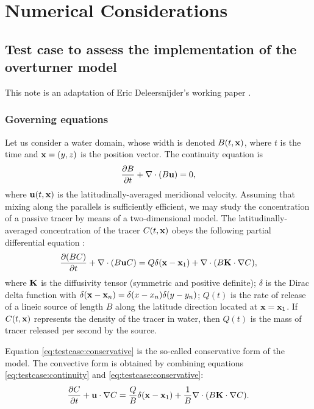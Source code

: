 \chapter{Numerical Considerations}
\section{Test case to assess the implementation of the overturner model}
This note is an adaptation of Eric Deleersnijder's working paper \cite{deleersnijder2011test}.

\subsection{Governing equations}
Let us consider a water domain, whose width is denoted $B(t,\mathbf{x})$, where $t$ is the time and $\mathbf{x} = (y,z)$ is the position vector. The continuity equation is
\begin{equation} \label{eq:testcase:continuity}
	\frac{\partial B}{\partial t} + \nabla \cdot (B\mathbf{u}) = 0,
\end{equation}
where $\mathbf{u}(t,\mathbf{x})$ is the latitudinally-averaged meridional velocity. Assuming that mixing along the parallels is sufficiently efficient, we may study the concentration of a passive tracer by means of a two-dimensional model. The latitudinally-averaged concentration of the tracer $C(t,\mathbf{x})$ obeys the following partial differential equation :
\begin{equation} \label{eq:testcase:conservative}
	\frac{\partial (BC)}{\partial t} + \nabla \cdot (B \mathbf{u} C) = Q\delta(\mathbf{x} - \mathbf{x}_1) + \nabla \cdot (B\mathbf{K} \cdot \nabla C), 
\end{equation}
where $\mathbf{K}$ is the diffusivity tensor (symmetric and positive definite); $\delta$ is the Dirac delta function with $\delta(\mathbf{x}-\mathbf{x}_n) = \delta(x-x_n)\delta(y-y_n)$; $Q(t)$ is the rate of release of a lineic source of length $B$ along the latitude direction located at $\mathbf{x} = \mathbf{x}_1$. If $C(t,\mathbf x)$ represents the 
density of the tracer in water, then $Q(t)$ is the mass of tracer released per second by the source.

Equation \eqref{eq:testcase:conservative} is the so-called conservative form of the model. The convective form is obtained by combining equations \eqref{eq:testcase:continuity} and \eqref{eq:testcase:conservative}:
\begin{equation}  \label{eq:testcase:convective}
	\frac{\partial C}{\partial t} + \mathbf{u} \cdot \nabla C = \frac{Q}{B} \delta(\mathbf{x} - \mathbf{x}_1) + \frac{1}{B} \nabla \cdot (B\mathbf{K} \cdot \nabla C).
\end{equation}

